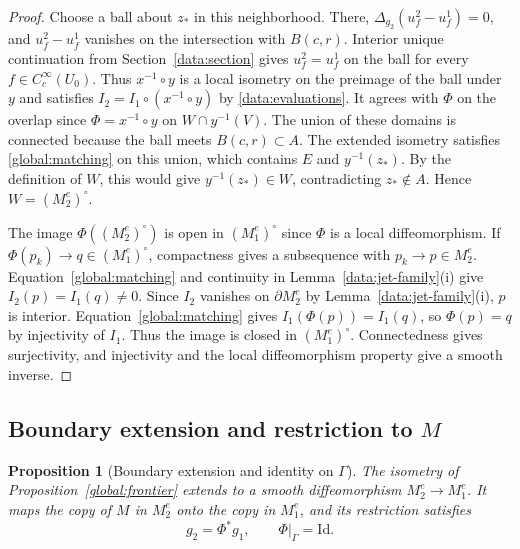 \documentclass[11pt,a4paper]{article}
\newtheorem{proposition}[theorem]{Proposition}
\theoremstyle{definition}
\theoremstyle{remark}
\newcommand{\Id}{\mathrm{Id}}
\numberwithin{equation}{section}
\begin{document}
\begin{proof}
Choose a ball about $z_*$ in this neighborhood. There,
$\Delta_{g_2}(u_f^2-u_f^1)=0$, and $u_f^2-u_f^1$ vanishes on the
intersection with $B(c,r)$. Interior unique continuation from
Section~\ref{data:section} gives $u_f^2=u_f^1$ on the ball for every
$f\in C_c^\infty(U_0)$. Thus $x^{-1}\circ y$ is a local isometry
on the preimage of the ball under $y$ and satisfies
$I_2=I_1\circ(x^{-1}\circ y)$ by \eqref{data:evaluations}.
It agrees with $\Phi$ on the overlap since $\Phi=x^{-1}\circ y$
on $W\cap y^{-1}(V)$. The union of these domains is connected
because the ball meets $B(c,r)\subset A$. The extended isometry
satisfies \eqref{global:matching} on this union, which contains
$E$ and $y^{-1}(z_*)$. By the definition of $W$, this would give
$y^{-1}(z_*)\in W$, contradicting $z_*\notin A$.
Hence $W=(M_2^e)^\circ$.

The image $\Phi((M_2^e)^\circ)$ is open in $(M_1^e)^\circ$ since
$\Phi$ is a local diffeomorphism. If $\Phi(p_k)\to q\in(M_1^e)^\circ$,
compactness gives a subsequence with $p_k\to p\in M_2^e$.
Equation~\eqref{global:matching} and continuity in
Lemma~\ref{data:jet-family}(i) give $I_2(p)=I_1(q)\ne0$.
Since $I_2$ vanishes on $\partial M_2^e$ by Lemma~\ref{data:jet-family}(i),
$p$ is interior. Equation~\eqref{global:matching} gives
$I_1(\Phi(p))=I_1(q)$, so $\Phi(p)=q$ by injectivity of $I_1$.
Thus the image is closed in $(M_1^e)^\circ$.
Connectedness gives surjectivity, and injectivity and the local
diffeomorphism property give a smooth inverse.
\end{proof}

\subsection{Boundary extension and restriction to \texorpdfstring{$M$}{M}}

\begin{proposition}[Boundary extension and identity on $\Gamma$]
\label{global:completion}
The isometry of Proposition~\ref{global:frontier} extends to a smooth
diffeomorphism $M_2^e\to M_1^e$. It maps the copy of $M$ in $M_2^e$
onto the copy in $M_1^e$, and its restriction satisfies
\[
 g_2=\Phi^*g_1,\qquad \Phi|_\Gamma=\Id.
\]
\end{proposition}
\end{document}
